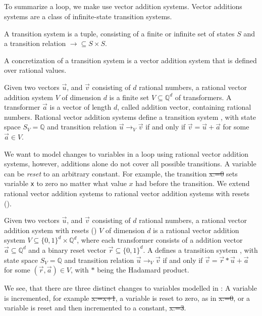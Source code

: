 \subsection{\qvasr}
To summarize a loop, we make use vector addition systems. Vector additions systems are a class of infinite-state transition systems.

\begin{mydef}
	A transition system \transSys{} is a tuple, consisting of a finite or infinite set of states $S$ and a transition relation $\rightarrow \subseteq S \times S$.
\end{mydef}

A concretization of a transition system is a vector addition system that is defined over rational values.

\begin{mydef}
	Given two vectors $\vec{u}$, and $\vec{v}$ consisting of $d$ rational numbers, a rational vector addition system $V$ of dimension $d$ is a finite set $V \subseteq \mathbb{Q}^d$ of transformers. A transformer $\vec{a}$ is a vector of length $d$, called addition vector, containing rational numbers. Rational vector addition systems define a transition system , with state space $S_V = \mathbb{Q}$ and transition relation $\vec{u} \rightarrow_V \vec{v}$ if and only if $\vec{v} = \vec{u} + \vec{a}$ for some $\vec{a} \in V$. 
\end{mydef}
We want to model changes to variables in a loop using rational vector addition systems, however, additions alone do not cover all possible transitions. A variable can be \textsl{reset} to an arbitrary constant. For example, the transition \st{x:=0} sets variable \texttt{x} to zero no matter what value $x$ had before the transition. We extend rational vector addition systems to rational vector addition systems with resets (\qvasr).

\begin{mydef}
		Given two vectors $\vec{u}$, and $\vec{v}$ consisting of $d$ rational numbers, a rational vector addition system with resets (\qvasr) $V$ of dimension $d$ is a rational vector addition system $V \subseteq \{0, 1\}^d \times \mathbb{Q}^d$, where each transformer consists of a addition vector $\vec{a} \subseteq \mathbb{Q}^d$ and a binary reset vector $\vec{r} \subseteq \{0, 1\}^d$. A \qvasr defines a transition system , with state space $S_V = \mathbb{Q}$ and transition relation $\vec{u} \rightarrow_V \vec{v}$ if and only if $\vec{v} = \vec{r} * \vec{u} + \vec{a}$ for some $(\vec{r}, \vec{a}) \in V$, with $*$ being the Hadamard product.
\end{mydef}
We see, that there are three distinct changes to variables modelled in \qvasr: A variable is incremented, for example \st{x:=x+1}, a variable is reset to zero, as in \st{x:=0}, or a variable is reset and then incremented to a constant, \st{x:=3}. \par

